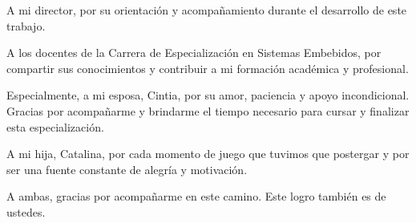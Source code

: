 \documentclass[
    11pt,
    spanish,
    singlespacing,
    parskip,
    headsepline,
    bookmarks=true,
    unicode=true,
    pdftoolbar=true,
    pdfmenubar=true,
    pdffitwindow=false,
    colorlinks=true,
    linkcolor=blue,
    citecolor=blue,
    urlcolor=blue
]{MastersDoctoralThesis}
\begin{document}



\frontmatter %
\pagestyle{plain} %


\begin{abstract}
\addchaptertocentry{\abstractname} %
Este documento presenta el desarrollo de un sistema modular para monitoreo y control industrial con comunicación inalámbrica y capacidades de automatización embebida. La solución propuesta permite adquirir datos de campo, controlar actuadores y facilitar la integración de estaciones distribuidas en entornos donde las soluciones cableadas resultan poco prácticas o costosas.

Su desarrollo requirió conocimientos en sistemas embebidos, diseño de hardware electrónico, desarrollo de firmware, sistemas operativos en tiempo real, protocolos de comunicación industrial, redes inalámbricas y diseño de software modular.
\end{abstract}




\begin{acknowledgements}
	\vspace{1.5cm}
	
	A mi director, por su orientación y acompañamiento durante el desarrollo de este trabajo.
	
	A los docentes de la Carrera de Especialización en Sistemas Embebidos, por compartir sus conocimientos y contribuir a mi formación académica y profesional.
	
	Especialmente, a mi esposa, Cintia, por su amor, paciencia y apoyo incondicional. Gracias por acompañarme y brindarme el tiempo necesario para cursar y finalizar esta especialización.
	
	A mi hija, Catalina, por cada momento de juego que tuvimos que postergar y por ser una fuente constante de alegría y motivación. 
	
	A ambas, gracias por acompañarme en este camino. Este logro también es de ustedes.
	
\end{acknowledgements}
\end{document}
